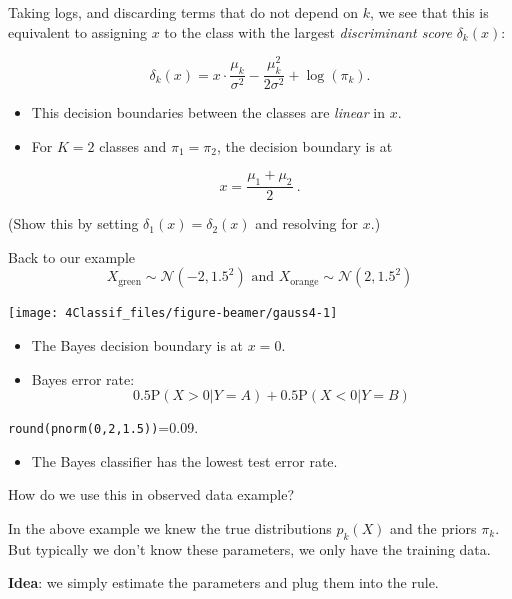 \documentclass[
  10pt,
  ignorenonframetext,
]{beamer}
\providecommand{\tightlist}{%
  \setlength{\itemsep}{0pt}\setlength{\parskip}{0pt}}
\begin{document}
\begin{frame}
Taking logs, and discarding terms that do not depend on \(k\), we see
that this is equivalent to assigning \(x\) to the class with the largest
\emph{discriminant score} \(\delta_k(x)\):

\[\delta_k(x) = x\cdot \frac{\mu_k}{\sigma^2} - \frac{\mu_k^2}{2 \sigma^2}+\log(\pi_k).\]

\begin{itemize}
\item
  This decision boundaries between the classes are \emph{linear} in
  \(x\).
\item
  For \(K=2\) classes and \(\pi_1=\pi_2\), the decision boundary is at
\end{itemize}

\[x = \frac{\mu_1+ \mu_2}{2} \ .\]

(Show this by setting \(\delta_1(x)=\delta_2(x)\) and resolving for
\(x\).)
\end{frame}

\begin{frame}[fragile]
\begin{block}{Back to our example}
\protect\hypertarget{back-to-our-example}{}
\[X_{\text{green}}\sim \mathcal{N}(-2, 1.5^2) \text{ and }
X_{\text{orange}}\sim \mathcal{N}(2, 1.5^2) \]

\begin{center}\texttt{[image: 4Classif\_files/figure-beamer/gauss4-1]} \end{center}

\begin{itemize}
\tightlist
\item
  The Bayes decision boundary is at \(x=0\).
\item
  Bayes error rate: \[
  0.5\text{P}(X>0|Y=A) + 0.5 \text{P}(X<0|Y=B)
  \]
\end{itemize}

\texttt{round(pnorm(0,2,1.5))}=0.09.

\begin{itemize}
\tightlist
\item
  The Bayes classifier has the lowest test error rate.
\end{itemize}
\end{block}
\end{frame}

\begin{frame}{How do we use this in observed data example?}
\protect\hypertarget{how-do-we-use-this-in-observed-data-example}{}
\vspace{2mm}

In the above example we knew the true distributions \(p_k(X)\) and the
priors \(\pi_k\). But typically we don't know these parameters, we only
have the training data.

\textbf{Idea}: we simply estimate the parameters and plug them into the
rule.
\end{frame}
\end{document}
